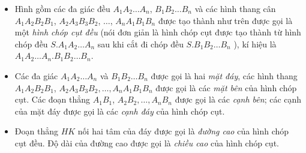 \begin{itemize}
\begin{center}
	\end{center}
	\begin{itemize}
		\item Hình gồm các đa giác đều $A_1A_2\ldots A_n$, $B_1B_2\ldots B_n$ và các hình thang cân $A_1A_2B_2B_1$, $A_2A_3 B_3B_2$, $\ldots$, $A_nA_1B_1B_n$ được tạo thành như trên được gọi là một \textit{hình chóp cụt đều} (nói đơn giản là hình chóp cụt được tạo thành từ hình chóp đều $S . A_1A_2\ldots A_n$ sau khi cắt đi chóp đều $S.B_1B_2\ldots B_n$ ), kí hiệu là $A_1A_2\ldots A_n.B_1B_2\ldots B_n$.
		
		\item Các đa giác $A_1A_2\ldots A_n$ và $B_1B_2\ldots B_n$ được gọi là hai \textit{mặt đáy}, các hình thang $A_1A_2B_2B_1$, $A_2A_3 B_3B_2, \ldots, A_nA_1B_1B_n$ được gọi là các \textit{mặt bên} của hình chóp cụt. Các đoạn thẳng $A_1B_1$, $A_2B_2, \ldots, A_nB_n$ được gọi là các \textit{cạnh bên}; các cạnh của mặt đáy được gọi là các \textit{cạnh đáy} của hình chóp cụt.
		
		\item Đoạn thẳng $H K$ nối hai tâm của đáy được gọi là \textit{đường cao} của hình chóp cụt đều. Độ dài của đường cao được gọi là \textit{chiều cao} của hình chóp cụt.
	\end{itemize}
\end{itemize}

